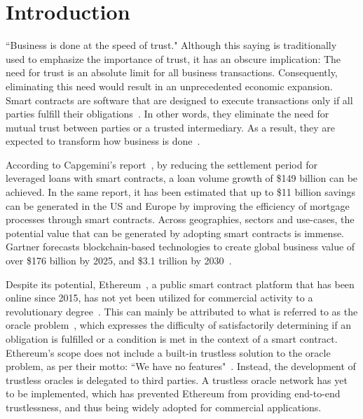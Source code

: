 \documentclass[12pt]{article}
\begin{document}
\section{Introduction}
\label{sec:introduction}

``Business is done at the speed of trust."
Although this saying is traditionally used to emphasize the importance of trust, it has an obscure implication: The need for trust is an absolute limit for all business transactions.
Consequently, eliminating this need would result in an unprecedented economic expansion.
Smart contracts are software that are designed to execute transactions only if all parties fulfill their obligations~\cite{Szabo:1994}.
In other words, they eliminate the need for mutual trust between parties or a trusted intermediary.
As a result, they are expected to transform how business is done~\cite{Chamber:2016}.

According to Capgemini's report~\cite{Capgemini:2016}, by reducing the settlement period for leveraged loans with smart contracts, a loan volume growth of \$149 billion can be achieved.
In the same report, it has been estimated that up to \$11 billion savings can be generated in the US and Europe by improving the efficiency of mortgage processes through smart contracts.
Across geographies, sectors and use-cases, the potential value that can be generated by adopting smart contracts is immense.
Gartner forecasts blockchain-based technologies to create global business value of over \$176 billion by 2025, and \$3.1 trillion by 2030~\cite{Gartner:2017}.

Despite its potential, Ethereum~\cite{Buterin:2014}, a public smart contract platform that has been online since 2015, has not yet been utilized for commercial activity to a revolutionary degree~\cite{Bartoletti:2017}.
This can mainly be attributed to what is referred to as the oracle problem~\cite{Barr:2015}, which expresses the difficulty of satisfactorily determining if an obligation is fulfilled or a condition is met in the context of a smart contract.
Ethereum's scope does not include a built-in trustless solution to the oracle problem, as per their motto: ``We have no features"~\cite{Ethereum:2014}.
Instead, the development of trustless oracles is delegated to third parties.
A trustless oracle network has yet to be implemented, which has prevented Ethereum from providing end-to-end trustlessness, and thus being widely adopted for commercial applications.
\end{document}
